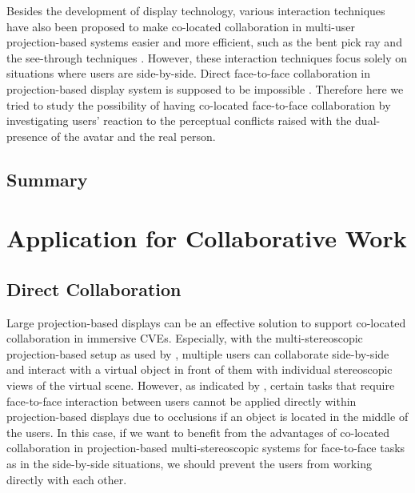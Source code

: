 Besides the development of display technology, various interaction techniques have also been proposed to make co-located collaboration in multi-user projection-based systems easier and more efficient, such as the bent pick ray \citep{Riege2006Bent} and the see-through techniques \citep{Argelaguet2010STT}. However, these interaction techniques focus solely on situations where users are side-by-side. Direct face-to-face collaboration in projection-based display system is supposed to be impossible \citep{Salzmann2009CIC}. Therefore here we tried to study the possibility of having co-located face-to-face collaboration by investigating users' reaction to the perceptual conflicts raised with the dual-presence of the avatar and the real person.

\subsection{Summary}

\section{Application for Collaborative Work}
\subsection{Direct Collaboration}
Large projection-based displays can be an effective solution to support co-located collaboration in immersive CVEs. Especially, with the multi-stereoscopic projection-based setup as used by \citet{Salzmann2009VRPointing}, multiple users can collaborate side-by-side and interact with a virtual object in front of them with individual stereoscopic views of the virtual scene. However, as indicated by \citet{Salzmann2009CIC}, certain tasks that require face-to-face interaction between users cannot be applied directly within projection-based displays due to occlusions if an object is located in the middle of the users. In this case, if we want to benefit from the advantages of co-located collaboration in projection-based multi-stereoscopic systems for face-to-face tasks as in the side-by-side situations, we should prevent the users from working directly with each other.

